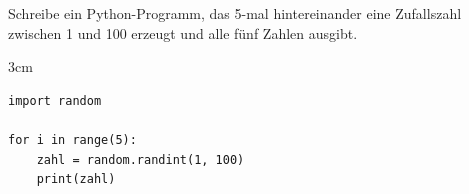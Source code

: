 \question[3]
Schreibe ein Python-Programm, das 5-mal hintereinander eine Zufallszahl zwischen 1 und 100
erzeugt und alle fünf Zahlen ausgibt.

\begin{solutionbox}{3cm}
\begin{lstlisting}
import random

for i in range(5):
    zahl = random.randint(1, 100)
    print(zahl)
\end{lstlisting}
\end{solutionbox}
